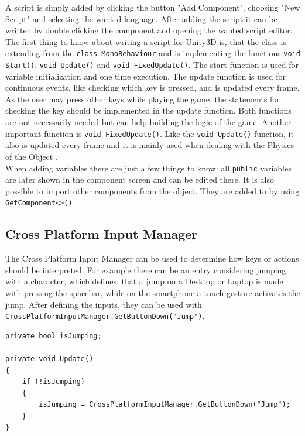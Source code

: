 \documentclass[conference]{IEEEtran}
\begin{document}
A script is simply added by clicking the button "Add Component", choosing "New Script" and selecting the wanted language. After adding the script it can be written by double clicking the component and opening the wanted script editor. \\
The first thing to know about writing a script for Unity3D is, that the class is extending from the \lstinline!class MonoBehaviour! and is implementing the functions \lstinline!void Start()!, \lstinline!void Update()! and \lstinline!void FixedUpdate()!. 
The start function is used for variable initialization and one time execution.
The update function is used for continuous events, like checking which key is pressed, and is updated every frame\cite{b1}. As the user may press other keys while playing the game, the statements for checking the key should be implemented in the update function. Both functions are not necessarily needed but can help building the logic of the game.
Another important function is \lstinline!void FixedUpdate()!. Like the \lstinline!void Update()! function, it also is updated every frame and it is mainly used when dealing with the Physics of the Object \cite{b1}. \\
When adding variables there are just a few things to know: all \lstinline!public! variables are later shown in the component screen and can be edited there. It is also possible to import other components from the object. They are added to by using \lstinline!GetComponent<>()!

\subsection{Cross Platform Input Manager}

The Cross Platform Input Manager can be used to determine how keys or actions should be interpreted. For example there can be an entry considering jumping with a character, which defines, that a jump on a Desktop or Laptop is made with pressing the spacebar, while on the smartphone a touch gesture activates the jump. After defining the inputs, they can be used with \lstinline!CrossPlatformInputManager.GetButtonDown("Jump")!. \\

\begin{lstlisting}[caption=Example Implementation for Determining a Jump,label=list:character_controls_jump_implementation]
private bool isJumping;

private void Update()
{
	if (!isJumping)
	{
		isJumping = CrossPlatformInputManager.GetButtonDown("Jump");
	}
}
\end{lstlisting}
\end{document}

